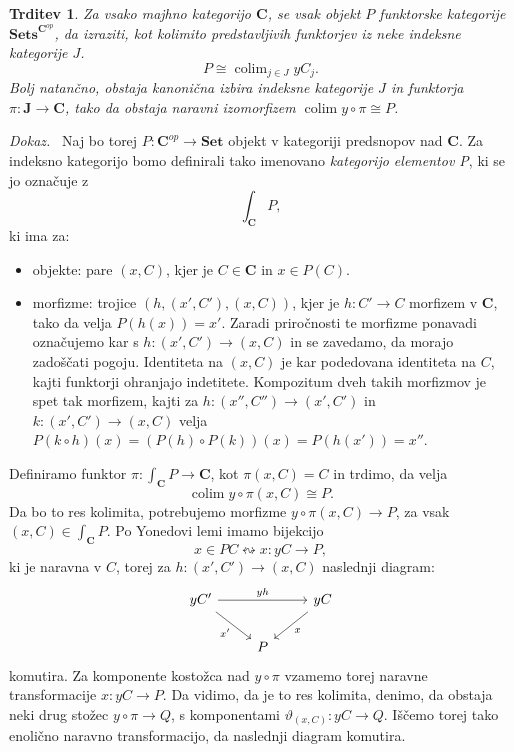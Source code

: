 \documentclass[12pt,a4paper]{book}
\theoremstyle{definition}
\theoremstyle{plain}
\newtheorem{trditev}[definicija]{Trditev}
\newenvironment{dokaz}{\emph{Dokaz.}\ }{\hspace{\fill}{$\Box$}}
\theoremstyle{definition}
\theoremstyle{remark}
\newcommand{\cat}[1]{\textbf{#1}}
\DeclareMathOperator{\colim}{colim}
\newcommand{\predsnop}[1]{\cat{Sets}^{\cat{#1}^{op}}}
\begin{document}
\begin{trditev}
\label{density theorem}
Za vsako majhno kategorijo $\cat{C}$, se vsak objekt $P$ funktorske kategorije $\predsnop{C}$, da izraziti, kot kolimito predstavljivih funktorjev iz neke indeksne kategorije $J$.
$$ P \cong \colim_{j \in J} yC_j.$$
Bolj natančno, obstaja kanonična izbira indeksne kategorije $J$ in funktorja $\pi : \cat{J} \to \cat{C}$, tako da obstaja naravni izomorfizem $\colim y \circ \pi \cong P$.
\end{trditev}
\begin{dokaz}
Naj bo torej $P : \cat{C}^{op} \to \cat{Set}$ objekt v kategoriji predsnopov nad $\cat{C}$. Za indeksno kategorijo bomo definirali tako imenovano \emph{kategorijo elementov P}, ki se jo označuje z
$$\int_{\cat{C}}P,$$
ki ima za:
\begin{itemize}
\item objekte: pare $(x,C)$, kjer je $C \in \cat{C}$ in $x \in P(C)$.
\item morfizme: trojice $(h, (x',C'), (x,C))$, kjer je $h : C' \to C$ morfizem v $\cat{C}$, tako da velja $P(h(x)) = x'$. Zaradi priročnosti te morfizme ponavadi označujemo kar s $h : (x', C') \to (x,C)$ in se zavedamo, da morajo zadoščati pogoju.
Identiteta na $(x,C)$ je kar podedovana identiteta na $C$, kajti funktorji ohranjajo indetitete. Kompozitum dveh takih morfizmov je spet tak morfizem, kajti za $h : (x'', C'') \to (x', C')$ in $k : (x', C') \to (x,C)$ velja $P(k \circ h)(x) = (P(h) \circ P(k))(x) = P(h(x')) = x''$.
\end{itemize}
Definiramo funktor $\pi : \int_{\cat{C}}P \to \cat{C}$, kot $\pi(x,C) = C$ in trdimo, da velja 
$$\colim y\circ \pi (x,C) \cong P.$$
Da bo to res kolimita, potrebujemo morfizme $y\circ \pi (x,C) \to P$, za vsak $(x,C) \in \int_{\cat{C}}P$. Po Yonedovi lemi imamo bijekcijo
$$x \in PC \leftrightsquigarrow x:yC \to P,$$
ki je naravna v $C$, torej za $h: (x',C') \to (x,C)$ naslednji diagram:
$$ \begin{tikzcd}
yC' \ar[rr, "yh"] \ar[rd, "x'"'] & & yC \ar[ld, "x"] \\
& P &
\end{tikzcd} $$
komutira. Za komponente kostožca nad $y \circ \pi$ vzamemo torej naravne transformacije $x : yC \to P$. Da vidimo, da je to res kolimita, denimo, da obstaja neki drug stožec $y \circ \pi \to Q$, s komponentami $\vartheta_{(x,C)} : yC \to Q$. Iščemo torej tako enolično naravno transformacijo, da naslednji diagram komutira.


\end{dokaz}
\end{document}
